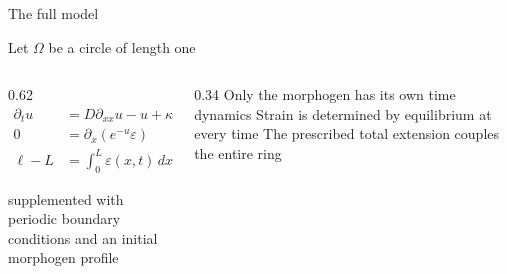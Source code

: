 \begin{frame}{The full model}

  \vspace{-0.06cm}

  {\color{HydraWhite}\fontsize{8.6}{10.8}\selectfont
    Let $\Omega$ be a circle of length one
  \par}

  \vspace{0.22cm}

  \begin{columns}[c,onlytextwidth]
    \begin{column}{0.62\textwidth}
      {\color{HydraWhite}\fontsize{10.6}{13.4}\selectfont
      \begin{align*}
        \partial_tu
        &=D\partial_{xx}u-u+\kappa\varepsilon
        \\
        0
        &=\partial_x\!\left(e^{-u}\varepsilon\right)
        \\
        \ell-L
        &=\int_0^L\varepsilon(x,t)\,dx
      \end{align*}
      }
      \par
      \vspace{-0.24cm}
      {\color{HydraMuted}\fontsize{7.5}{9.2}\selectfont
        supplemented with periodic boundary conditions and an initial morphogen profile
      \par}
    \end{column}

    \begin{column}{0.34\textwidth}
        {Only the morphogen has its own time dynamics}
      \vspace{-0.04cm}
        {Strain is determined by equilibrium at every time}
      \vspace{-0.04cm}
        {The prescribed total extension couples the entire ring}
    \end{column}
  \end{columns}

\end{frame}






